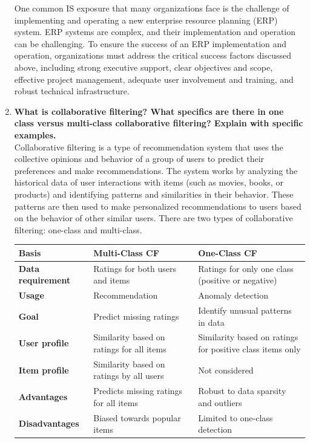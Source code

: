 \documentclass[12pt]{article}
\begin{document}
\begin{enumerate}
One common IS exposure that many organizations face is the challenge of implementing and operating a new enterprise resource planning (ERP) system. ERP systems are complex, and their implementation and operation can be challenging. To ensure the success of an ERP implementation and operation, organizations must address the critical success factors discussed above, including strong executive support, clear objectives and scope, effective project management, adequate user involvement and training, and robust technical infrastructure.

\item{\bfseries What is collaborative filtering? What specifics are there in one class versus multi-class collaborative filtering? Explain with specific examples.\\}
Collaborative filtering is a type of recommendation system that uses the collective opinions and behavior of a group of users to predict their preferences and make recommendations. The system works by analyzing the historical data of user interactions with items (such as movies, books, or products) and identifying patterns and similarities in their behavior. These patterns are then used to make personalized recommendations to users based on the behavior of other similar users.
There are two types of collaborative filtering: one-class and multi-class.
\begin{longtable}{|L{3cm}|L{5cm}|L{5cm}|}
    \hline
    \textbf{Basis} & \textbf{Multi-Class CF} & \textbf{One-Class CF} \\
    \hline
    \textbf{Data requirement} & Ratings for both users and items & Ratings for only one class (positive or negative) \\
    \hline
    \textbf{Usage} & Recommendation & Anomaly detection \\
    \hline
    \textbf{Goal} & Predict missing ratings & Identify unusual patterns in data \\
    \hline
    \textbf{User profile} & Similarity based on ratings for all items & Similarity based on ratings for positive class items only \\
    \hline
    \textbf{Item profile} & Similarity based on ratings by all users & Not considered \\
    \hline
    \textbf{Advantages} & Predicts missing ratings for all items & Robust to data sparsity and outliers \\
    \hline
    \textbf{Disadvantages} & Biased towards popular items & Limited to one-class detection \\
    \hline
    \end{longtable}
    

\end{enumerate}
\end{document}
